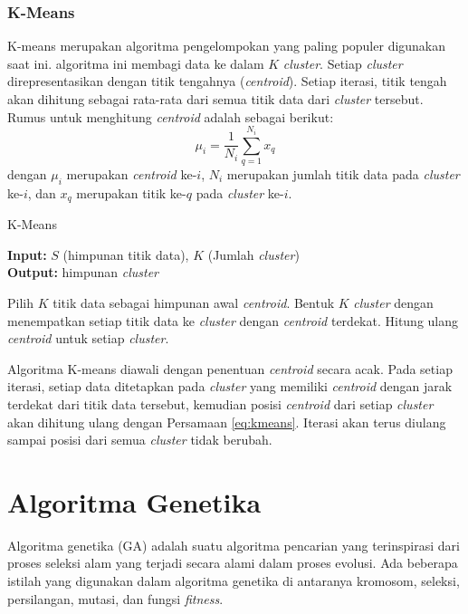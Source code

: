 \subsubsection{K-Means}
K-means merupakan algoritma pengelompokan yang paling populer digunakan saat ini. algoritma ini membagi data ke dalam $K$ \textit{cluster}. Setiap \textit{cluster} direpresentasikan dengan titik tengahnya (\textit{centroid}). Setiap iterasi, titik tengah akan dihitung sebagai rata-rata dari semua titik data dari \textit{cluster} tersebut. Rumus untuk menghitung \textit{centroid} adalah sebagai berikut:
\begin{equation}
\label{eq:kmeans}
\mu_i=\frac{1}{N_i}\sum_{q=1}^{N_i}x_q
\end{equation}
dengan $\mu_i$ merupakan \textit{centroid} ke-$i$, $N_i$ merupakan jumlah titik data pada \textit{cluster} ke-$i$, dan $x_q$ merupakan titik ke-$q$ pada \textit{cluster} ke-$i$.

\begin{algorithm} %
\caption{K-Means} %
\label{alg:kmeans} %
\begin{flushleft}
	\textbf{Input:} $S$ (himpunan titik data), $K$ (Jumlah \textit{cluster})\\
	\textbf{Output:} himpunan \textit{cluster}
\end{flushleft}
\begin{algorithmic}[1] %
	\STATE Pilih $K$ titik data sebagai himpunan awal \textit{centroid}.
	\REPEAT 
		\STATE Bentuk $K$ \textit{cluster} dengan menempatkan setiap titik data ke \textit{cluster} dengan \textit{centroid} terdekat.
		\STATE Hitung ulang \textit{centroid} untuk setiap \textit{cluster}. 
\end{algorithmic}
\end{algorithm}

Algoritma K-means diawali dengan penentuan \textit{centroid} secara acak. Pada setiap iterasi, setiap data ditetapkan pada \textit{cluster} yang memiliki \textit{centroid} dengan jarak terdekat dari titik data tersebut, kemudian posisi \textit{centroid} dari setiap \textit{cluster} akan dihitung ulang dengan Persamaan \ref{eq:kmeans}. Iterasi akan terus diulang sampai posisi dari semua \textit{cluster} tidak berubah.

\section{Algoritma Genetika}
Algoritma genetika (GA) adalah suatu algoritma pencarian yang terinspirasi dari proses seleksi alam yang terjadi secara alami dalam proses evolusi. Ada beberapa istilah yang digunakan dalam algoritma genetika di antaranya kromosom, seleksi, persilangan, mutasi, dan fungsi \textit{fitness}.

